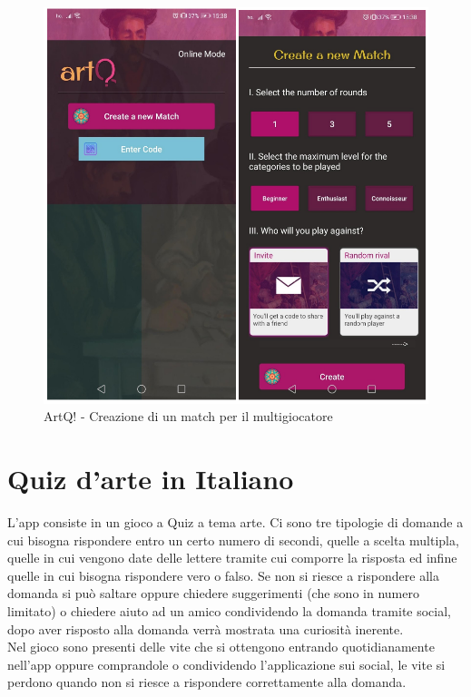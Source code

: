 \documentclass{article}
\begin{document}
\begin{figure}[htp]
\begin{center}
\includegraphics[width=1 \textwidth]{Figure13.png}
\caption{ArtQ! - Creazione di un match per il multigiocatore}
\end{center}
\end{figure}

\newpage

\section{Quiz d’arte in Italiano}
L’app consiste in un gioco a Quiz a tema arte. Ci sono tre tipologie di domande a cui bisogna rispondere entro un certo numero di secondi, quelle a scelta multipla, quelle in cui vengono date delle lettere tramite cui comporre la risposta ed infine quelle in cui bisogna rispondere vero o falso. Se non si riesce a rispondere alla domanda si può saltare oppure chiedere suggerimenti (che sono in numero limitato) o chiedere aiuto ad un amico condividendo la domanda tramite social, dopo aver risposto alla domanda verrà mostrata una curiosità inerente.
\\\indent
Nel gioco sono presenti delle vite che si ottengono entrando quotidianamente nell’app oppure comprandole o condividendo l'applicazione sui social, le vite si perdono quando non si riesce a rispondere correttamente alla domanda.
\end{document}
